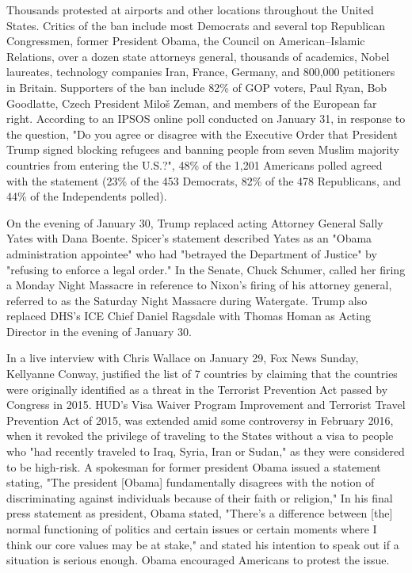 Thousands protested at airports and other locations throughout the
United States. Critics of the ban include most Democrats and several top
Republican Congressmen, former President Obama, the Council on
American--Islamic Relations, over a dozen state attorneys general,
thousands of academics, Nobel laureates, technology companies Iran,
France, Germany, and 800,000 petitioners in Britain. Supporters of the
ban include 82\% of GOP voters, Paul Ryan, Bob Goodlatte, Czech
President Miloš Zeman, and members of the European far right. According
to an IPSOS online poll conducted on January 31, in response to the
question, "Do you agree or disagree with the Executive Order that
President Trump signed blocking refugees and banning people from seven
Muslim majority countries from entering the U.S.?", 48\% of the 1,201
Americans polled agreed with the statement (23\% of the 453 Democrats,
82\% of the 478 Republicans, and 44\% of the Independents polled).

On the evening of January 30, Trump replaced acting Attorney General
Sally Yates with Dana Boente. Spicer's statement described Yates as an
"Obama administration appointee" who had "betrayed the Department of
Justice" by "refusing to enforce a legal order." In the Senate, Chuck
Schumer, called her firing a Monday Night Massacre in reference to
Nixon's firing of his attorney general, referred to as the Saturday
Night Massacre during Watergate. Trump also replaced DHS's ICE Chief
Daniel Ragsdale with Thomas Homan as Acting Director in the evening of
January 30.

In a live interview with Chris Wallace on January 29, Fox News Sunday,
Kellyanne Conway, justified the list of 7 countries by claiming that the
countries were originally identified as a threat in the Terrorist
Prevention Act passed by Congress in 2015. HUD's Visa Waiver Program
Improvement and Terrorist Travel Prevention Act of 2015, was extended
amid some controversy in February 2016, when it revoked the privilege of
traveling to the States without a visa to people who "had recently
traveled to Iraq, Syria, Iran or Sudan," as they were considered to be
high-risk. A spokesman for former president Obama issued a statement
stating, "The president {[}Obama{]} fundamentally disagrees with the
notion of discriminating against individuals because of their faith or
religion," In his final press statement as president, Obama stated,
"There's a difference between {[}the{]} normal functioning of politics
and certain issues or certain moments where I think our core values may
be at stake," and stated his intention to speak out if a situation is
serious enough. Obama encouraged Americans to protest the issue.

